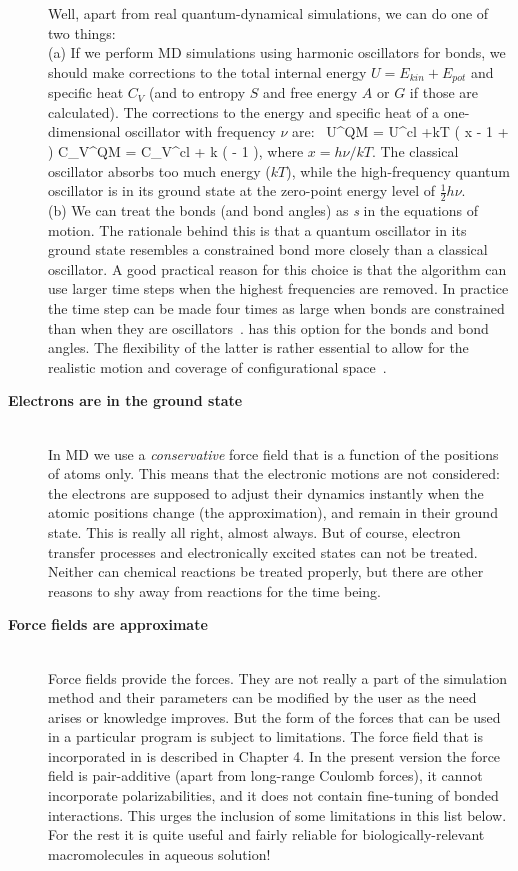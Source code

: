 \begin{description}
Well, apart from real quantum-dynamical simulations, we can do one
of two things: \\ (a) If we perform MD simulations using harmonic
oscillators for bonds, we should make corrections to the total
internal energy $U = E_{kin} + E_{pot}$ and specific heat $C_V$ (and
to entropy $S$ and free energy $A$ or $G$ if those are
calculated). The corrections to the energy and specific heat of a
one-dimensional oscillator with frequency $\nu$
are:~\cite{McQuarrie76}
\beq
 U^{QM} = U^{cl} +kT \left( \half x - 1 +  \right)
\eeq
\beq
 C_V^{QM} = C_V^{cl} + k \left(  - 1 \right), 
\eeq
where $x=h\nu /kT$. The classical oscillator absorbs too much energy
($kT$), while the high-frequency quantum oscillator is in its ground
state at the zero-point energy level of $\frac{1}{2} h\nu$. \\ (b) We
can treat the bonds (and bond angles) as {\em {}s}
in the equations of motion. The rationale behind this is that a quantum
oscillator in its ground state resembles a constrained bond more
closely than a classical oscillator. A good practical reason for this
choice is that the algorithm can use larger time steps when the
highest frequencies are removed. In practice the time step can be made
four times as large when bonds are constrained than when they are
oscillators~\cite{Gunsteren77}. {\gromacs} has this option for the
bonds and bond angles.  The flexibility of the latter is
rather essential to allow for the realistic motion and coverage of
configurational space~\cite{Gunsteren82}.

\item[{\bf Electrons are in the ground state}]\mbox{}\\
In MD we use a {\em conservative} force field that is a
function of the positions of atoms only.  This means that the
electronic motions are not considered: the electrons are supposed to
adjust their dynamics instantly when the atomic positions change
(the {\em {}} approximation), and remain in
their ground state. This is really all right, almost always. But of
course, electron transfer processes and electronically excited states
can not be treated. Neither can chemical reactions be treated
properly, but there are other reasons to shy away from reactions for
the time being.

\item[{\bf Force fields are approximate}]\mbox{}\\
Force fields  provide the forces.
They are not really a part of the
simulation method and their parameters can be modified by the user as the
need arises or knowledge improves. But the form of the forces that can
be used in a particular program is subject to limitations. The force
field that is incorporated in {\gromacs} is described in Chapter 4. In
the present version the force field is pair-additive (apart from
long-range Coulomb forces), it cannot incorporate
polarizabilities, and it does not contain fine-tuning of bonded
interactions. This urges the inclusion of some limitations in this
list below.  For the rest it is quite useful and fairly reliable for
biologically-relevant macromolecules in aqueous solution!


\end{description}
